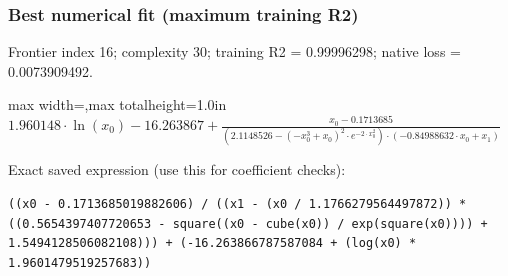 \documentclass[10pt,letterpaper,landscape]{article}
\begin{document}
\begin{minipage}[t]{0.485\textwidth}
\subsubsection*{Best numerical fit (maximum training R2)}
Frontier index 16; complexity 30; training R2 = 0.99996298; native loss = 0.0073909492.
\begin{center}\begin{adjustbox}{max width=\linewidth,max totalheight=1.0in}$\displaystyle 1.960148 \cdot \ln{\left(x_{0} \right)} - 16.263867 + \frac{x_{0} - 0.1713685}{\left(2.1148526 - \left(- x_{0}^{3} + x_{0}\right)^{2} \cdot e^{- 2 \cdot x_{0}^{2}}\right) \cdot \left(- 0.84988632 \cdot x_{0} + x_{1}\right)}$\end{adjustbox}\end{center}
{\scriptsize Exact saved expression (use this for coefficient checks):}
\begin{lstlisting}
((x0 - 0.1713685019882606) / ((x1 - (x0 / 1.1766279564497872)) * ((0.5654397407720653 - square((x0 - cube(x0)) / exp(square(x0)))) + 1.5494128506082108))) + (-16.263866787587084 + (log(x0) * 1.9601479519257683))
\end{lstlisting}
\end{minipage}\hfill
\end{document}
